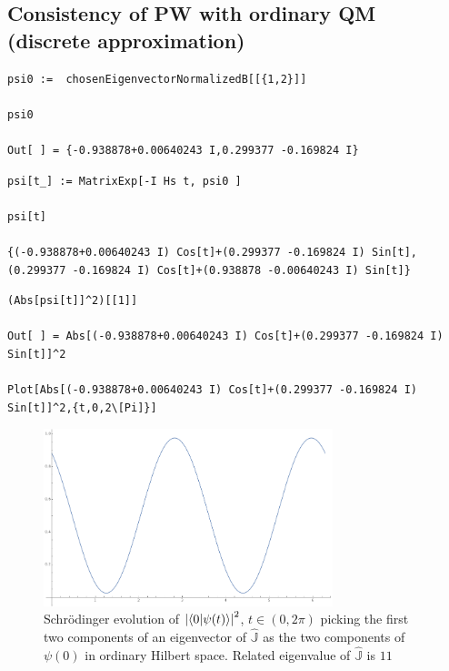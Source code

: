 \subsection{Consistency of PW with ordinary QM (discrete approximation)}

\begin{lstlisting}
psi0 :=  chosenEigenvectorNormalizedB[[{1,2}]]

psi0

Out[ ] = {-0.938878+0.00640243 I,0.299377 -0.169824 I}
\end{lstlisting}

\begin{lstlisting}
psi[t_] := MatrixExp[-I Hs t, psi0 ]

psi[t]

{(-0.938878+0.00640243 I) Cos[t]+(0.299377 -0.169824 I) Sin[t],(0.299377 -0.169824 I) Cos[t]+(0.938878 -0.00640243 I) Sin[t]}
\end{lstlisting}

\begin{lstlisting}
(Abs[psi[t]]^2)[[1]]

Out[ ] = Abs[(-0.938878+0.00640243 I) Cos[t]+(0.299377 -0.169824 I) Sin[t]]^2

Plot[Abs[(-0.938878+0.00640243 I) Cos[t]+(0.299377 -0.169824 I) Sin[t]]^2,{t,0,2\[Pi]}]
\end{lstlisting}
\begin{figure}
  \centering
  \includegraphics[width=0.75\textwidth]{img/probB_0.png}
  \caption[(from notebook)]{
    Schr{\"o}dinger evolution of
    $\qty|\braket{0}{\psi(t)}|^2$, $t \in (0, 2\pi) $
    picking the first two components of an eigenvector of $\hat{\mathbb{J}}$
    as the two components of $\psi(0)$ in ordinary Hilbert space.
    Related eigenvalue of $\hat{\mathbb{J}}$ is $11$
  }
\end{figure}

